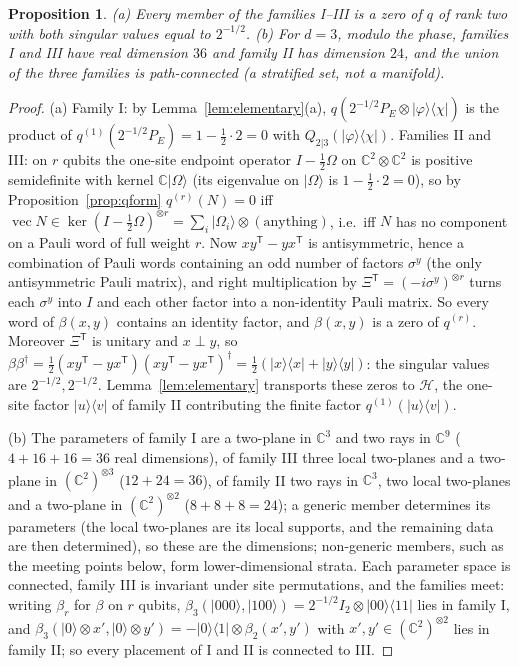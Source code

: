 \documentclass[aps,pra,twocolumn,superscriptaddress,nofootinbib,longbibliography]{revtex4-2}
\newcommand{\C}{\mathbb C}
\newcommand{\Hh}{\mathcal H}
\newcommand{\ket}[1]{|#1\rangle}
\newcommand{\bra}[1]{\langle #1|}
\newcommand{\Om}{\Omega}
\DeclareMathOperator{\vecop}{vec}
\newcommand{\T}{\mathsf T}
\theoremstyle{plain}
\newtheorem{proposition}[theorem]{Proposition}
\theoremstyle{definition}
\theoremstyle{remark}
\begin{document}
\begin{proposition}\label{prop:families}
\textup{(a)} Every member of the families I--III is a zero of $q$ of rank two with both singular values equal to $2^{-1/2}$.
\textup{(b)} For $d=3$, modulo the phase, families I and III have real dimension $36$ and family II has dimension $24$, and the union of the three families is path-connected (a stratified set, not a manifold).
\end{proposition}
\begin{proof}
(a) Family I: by Lemma~\ref{lem:elementary}(a), $q(2^{-1/2}P_E\otimes\ket\varphi\bra\chi)$ is the product of $q^{(1)}(2^{-1/2}P_E)=1-\tfrac12\cdot2=0$ with $Q_{2|3}(\ket\varphi\bra\chi)$.
Families II and III: on $r$ qubits the one-site endpoint operator $I-\tfrac12\Om$ on $\C^2\otimes\C^2$ is positive semidefinite with kernel $\C\ket\Om$ (its eigenvalue on $\ket\Om$ is $1-\tfrac12\cdot2=0$), so by Proposition~\ref{prop:qform} $q^{(r)}(N)=0$ iff $\vecop N\in\ker(I-\tfrac12\Om)^{\otimes r}=\sum_i\ket{\Om_i}\otimes(\text{anything})$, i.e.\ iff $N$ has no component on a Pauli word of full weight $r$. Now $xy^{\T}-yx^{\T}$ is antisymmetric, hence a combination of Pauli words containing an odd number of factors $\sigma^y$ (the only antisymmetric Pauli matrix), and right multiplication by $\Xi^{\T}=(-i\sigma^y)^{\otimes r}$ turns each $\sigma^y$ into $I$ and each other factor into a non-identity Pauli matrix. So every word of $\beta(x,y)$ contains an identity factor, and $\beta(x,y)$ is a zero of $q^{(r)}$. Moreover $\Xi^{\T}$ is unitary and $x\perp y$, so $\beta\beta^\dagger=\tfrac12(xy^{\T}-yx^{\T})(xy^{\T}-yx^{\T})^\dagger=\tfrac12(\ket x\bra x+\ket y\bra y)$: the singular values are $2^{-1/2},2^{-1/2}$. Lemma~\ref{lem:elementary} transports these zeros to $\Hh$, the one-site factor $\ket u\bra v$ of family II contributing the finite factor $q^{(1)}(\ket u\bra v)$.

(b) The parameters of family I are a two-plane in $\C^3$ and two rays in $\C^9$ ($4+16+16=36$ real dimensions), of family III three local two-planes and a two-plane in $(\C^2)^{\otimes3}$ ($12+24=36$), of family II two rays in $\C^3$, two local two-planes and a two-plane in $(\C^2)^{\otimes2}$ ($8+8+8=24$); a generic member determines its parameters (the local two-planes are its local supports, and the remaining data are then determined), so these are the dimensions; non-generic members, such as the meeting points below, form lower-dimensional strata. Each parameter space is connected, family III is invariant under site permutations, and the families meet: writing $\beta_r$ for $\beta$ on $r$ qubits, $\beta_3(\ket{000},\ket{100})=2^{-1/2}I_2\otimes\ket{00}\bra{11}$ lies in family I, and $\beta_3(\ket0\otimes x',\ket0\otimes y')=-\ket0\bra1\otimes\beta_2(x',y')$ with $x',y'\in(\C^2)^{\otimes2}$ lies in family II; so every placement of I and II is connected to III.
\end{proof}
\end{document}
